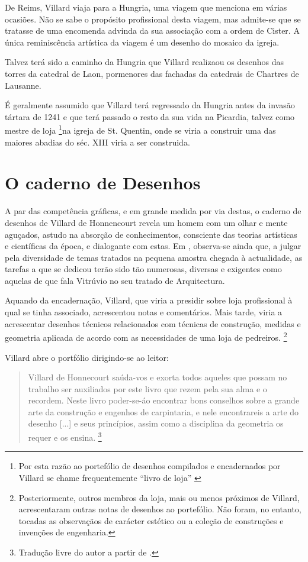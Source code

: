 \documentclass{article}
\begin{document}
De Reims, Villard viaja para a Hungria, uma viagem que menciona em
várias ocasiões. Não se sabe o propósito profissional desta viagem,
mas admite-se que se tratasse de uma encomenda advinda da sua
associação com a ordem de Cister. A única reminiscência artística da
viagem é um desenho do mosaico da igreja.

Talvez terá sido a caminho da Hungria que Villard realizaou os
desenhos das torres da catedral de Laon, pormenores das fachadas da
catedrais de Chartres de Lausanne.

É geralmente assumido \cite{teresa} que Villard terá regressado da
Hungria antes da invasão tártara de 1241 e que terá passado o resto da
sua vida na Picardia, talvez como mestre de loja \footnote{Por esta
  razão ao portefólio de desenhos compilados e encadernados por
  Villard se chame frequentemente ``livro de loja'' \cite{teresa}}na
igreja de St. Quentin, onde se viria a construir uma das maiores
abadias do séc. XIII viria a ser construida.

\section{O caderno de Desenhos}

A par das competência gráficas, e em grande medida por via destas, o
caderno de desenhos de Villard de Honnencourt revela um homem com um
olhar e mente aguçados, astudo na absorção de conhecimentos,
consciente das teorias artísticas e científicas da época, e dialogante
com estas. Em \cite{teresa}, observa-se ainda que, a julgar pela
diversidade de temas tratados na pequena amostra chegada à
actualidade, as tarefas a que se dedicou terão sido tão numerosas,
diversas e exigentes como aquelas de que fala Vitrúvio no seu tratado
de Arquitectura.

Aquando da encadernação, Villard, que viria a presidir sobre loja
profissional à qual se tinha associado, acrescentou notas e
comentários. Mais tarde, viria a acrescentar desenhos técnicos
relacionados com técnicas de construção, medidas e geometria aplicada
de acordo com as necessidades de uma loja de
pedreiros. \footnote{Posteriormente, outros membros da loja, mais ou
  menos próximos de Villard, acrescentaram outras notas de desenhos ao
  portefólio. Não foram, no entanto, tocadas as observaçãos de
  carácter estético ou a coleção de construções e invenções de
  engenharia.}

Villard abre o portfólio dirigindo-se ao leitor:

\begin{quote} Villard de Honnecourt saúda-vos e exorta todos aqueles
que possam no trabalho ser auxiliados por este livro que rezem pela
sua alma e o recordem. Neste livro poder-se-áo encontrar bons
conselhos sobre a grande arte da construção e engenhos de carpintaria,
e nele encontrareis a arte do desenho [...] e seus princípios, assim
como a disciplina da geometria os requer e os
ensina. \footnote{Tradução livre do autor a partir de \cite{teresa}.}
\end{quote}
\end{document}
